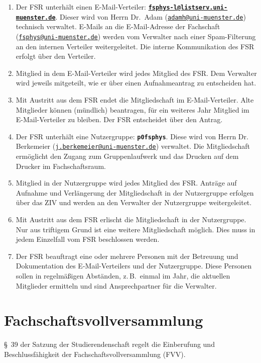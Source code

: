 \documentclass[
	a4paper,
	12pt,
	oneside,
	parskip=half-,
	pagesize,
	headsepline,
	german,
	ngerman
]{scrartcl}
\newcommand{\email}[1]{\href{mailto:#1}{\texttt{#1}}}
\begin{document}
\begin{enumerate}
	\item Der FSR unterhält einen E-Mail-Verteiler: \textbf{\email{fsphys-l@listserv.uni-muenster.de}}. Dieser wird von Herrn Dr.\ Adam (\email{adamh@uni-muenster.de}) technisch verwaltet. E-Mails an die E-Mail-Adresse der Fachschaft (\email{fsphys@uni-muenster.de}) werden vom Verwalter nach einer Spam-Filterung an den internen Verteiler weitergeleitet. Die interne Kommunikation des FSR erfolgt über den Verteiler.
	\item Mitglied in dem E-Mail-Verteiler wird jedes Mitglied des FSR. Dem Verwalter wird jeweils mitgeteilt, wie er über einen Aufnahmeantrag zu entscheiden hat.
	\item Mit Austritt aus dem FSR endet die Mitgliedschaft im E-Mail-Verteiler. Alte Mitglieder können (mündlich) beantragen, für ein weiteres Jahr Mitglied im E-Mail-Verteiler zu bleiben. Der FSR entscheidet über den Antrag.
	\item Der FSR unterhält eine Nutzergruppe: \textbf{\texttt{p0fsphys}}. Diese wird von Herrn Dr. Berkemeier (\email{j.berkemeier@uni-muenster.de}) verwaltet. Die Mitgliedschaft ermöglicht den Zugang zum Gruppenlaufwerk und das Drucken auf dem Drucker im Fachschaftsraum.
	\item Mitglied in der Nutzergruppe wird jedes Mitglied des FSR. Anträge auf Aufnahme und Verlängerung der Mitgliedschaft in der Nutzergruppe erfolgen über das ZIV und werden an den Verwalter der Nutzergruppe weitergeleitet.
	\item Mit Austritt aus dem FSR erlischt die Mitgliedschaft in der Nutzergruppe. Nur aus triftigem Grund ist eine weitere Mitgliedschaft möglich. Dies muss in jedem Einzelfall vom FSR beschlossen werden.
	\item Der FSR beauftragt eine oder mehrere Personen mit der Betreuung und Dokumentation des E-Mail-Verteilers und der Nutzergruppe. Diese Personen sollen in regelmäßigen Abständen, z.\,B.\ einmal im Jahr, die aktuellen Mitglieder ermitteln und sind Ansprechpartner für die Verwalter.
	\label{item:Ansprechpartner}
\end{enumerate}

\section{Fachschaftsvollversammlung}
§~39 der Satzung der Studierendenschaft regelt die Einberufung und Beschlussfähigkeit der Fachschaftsvollversammlung (FVV).
\end{document}
